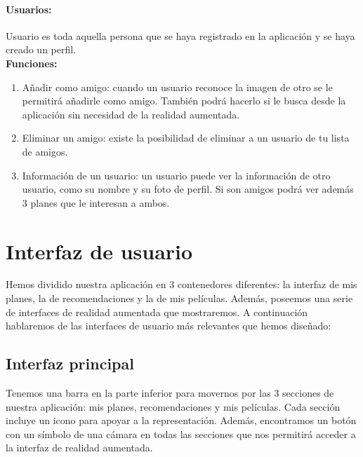 \paragraph{\large Usuarios:\\}
Usuario es toda aquella persona que se haya registrado en la aplicación y se haya creado un perfil.
\\
\textbf{Funciones:}
\begin{enumerate}
    \item Añadir como amigo: cuando un usuario reconoce la imagen de otro se le permitirá añadirle como amigo. También podrá hacerlo si le busca desde la aplicación sin necesidad de la realidad aumentada.
    \item Eliminar un amigo: existe la posibilidad de eliminar a un usuario de tu lista de amigos.
    \item Información de un usuario: un usuario puede ver la información de otro usuario, como su nombre y su foto de perfil. Si son amigos podrá ver además 3 planes que le interesan a ambos.
\end{enumerate} 

\section{Interfaz de usuario}
\label{makereference3.4}

Hemos dividido nuestra aplicación en 3 contenedores diferentes: la interfaz de mis planes, la de recomendaciones y la de mis películas. Además, poseemos una serie de interfaces de realidad aumentada que mostraremos. A continuación hablaremos
de las interfaces de usuario más relevantes que hemos diseñado:
\subsection{Interfaz principal}
\label{makereference3.4.1}
Tenemos una barra en la parte inferior para movernos por las 3 secciones de nuestra aplicación: mis planes, recomendaciones y mis películas.
Cada sección incluye un icono para apoyar a la representación.
Además, encontramos un botón con un símbolo de una cámara en todas las secciones que nos permitirá acceder a la interfaz de realidad aumentada.
